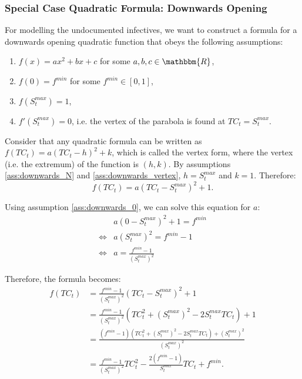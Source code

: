 \documentclass[12pt]{article}
\newcommand{\R}{\mathbbm{R}}
\begin{document}
\begin{appendices}
		\subsubsection{Special Case Quadratic Formula: Downwards Opening} \label{ssapp:downwards_derivation_vertex}
		For modelling the undocumented infectives, we want to construct a formula for a downwards opening quadratic function that obeys the following assumptions:
		\begin{enumerate}[label=(\Roman*)]
		    \item\label{ass:downwards_formula} $f(x) = ax^2 + bx + c$  for some $a, b, c \in \R$,
		    \item\label{ass:downwards_0} $f(0) = f^{min}$ for some $f^{min} \in [0,1]$,
		    \item\label{ass:downwards_N} $f(S^{max}_t) = 1$,
		    \item\label{ass:downwards_vertex} $f'(S^{max}_t) = 0$, i.e. the vertex of the parabola is found at $TC_t = S^{max}_t$.
		\end{enumerate}
		
		Consider that any quadratic formula can be written as $f(TC_t) = a(TC_t - h)^2 + k$, which is called the vertex form, where the vertex (i.e. the extremum) of the function is $(h, k)$. By assumptions \ref{ass:downwards_N} and \ref{ass:downwards_vertex}, $h=S^{max}_t$ and $k=1$. Therefore:
		    \[f(TC_t) = a(TC_t - S^{max}_t)^2 + 1.\]
		    
		\noindent Using assumption \ref{ass:downwards_0}, we can solve this equation for $a$:
		    \begin{align*}
		        & a(0 - S^{max}_t)^2 + 1 = f^{min}\\
		        \iff & a\left(S^{max}_t\right)^2 = f^{min} - 1\\
		        \iff & a = \frac{f^{min} - 1}{\left(S^{max}_t\right)^2}
		    \end{align*}
		    
		\noindent Therefore, the formula becomes:
		    \begin{align*}
		        f(TC_t) &= \frac{f^{min} - 1}{\left(S^{max}_t\right)^2}(TC_t - S^{max}_t)^2 + 1 \\
		        &= \frac{f^{min} - 1}{\left(S^{max}_t\right)^2}(TC_t^2 + \left(S^{max}_t\right)^2 -2S^{max}_tTC_t) + 1 \\
		        &= \frac{(f^{min} - 1)(TC_t^2 + \left(S^{max}_t\right)^2 -2S^{max}_tTC_t) + \left(S^{max}_t\right)^2}{\left(S^{max}_t\right)^2}\\
                &= \frac{f^{min} - 1}{\left(S^{max}_t\right)^2}TC_t^2 - \frac{2(f^{min} - 1)}{S^{max}_t}TC_t + f^{min}.
		    \end{align*}
		

\end{appendices}
\end{document}

